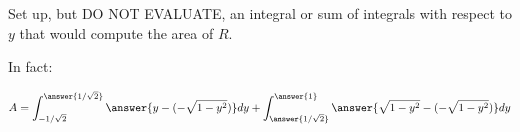 \documentclass{ximera}
\begin{document}
\begin{exercise}
\begin{exercise}
\begin{exercise}
\end{exercise}
\end{exercise}

\begin{exercise}
Set up, but DO NOT EVALUATE, an integral or sum of integrals with respect to $y$ that would compute the area of $R$. 

\begin{multipleChoice}
\end{multipleChoice}

\begin{exercise}
In fact: 

\[
A=\int_{-1/\sqrt{2}}^{\answer{1/\sqrt{2}}} \answer{y - (-\sqrt{1-y^2})} dy+\int_{\answer{1/\sqrt{2} }}^{\answer{1}} \answer{\sqrt{1-y^2} - (-\sqrt{1-y^2})} dy
\]

\end{exercise}	
\end{exercise}

\end{exercise}
\end{document}

